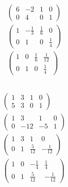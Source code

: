 \documentclass{article}
\begin{document}
\begin{align*}
  \left( \begin{array}{cc|cc}
           6 & -2 & 1 & 0 \\
           0 & 4  & 0 & 1
         \end{array} \right)                          \\
  \left( \begin{array}{cc|cc}
           1 & -\frac{1}{3} & \frac{1}{6} & 0           \\
           0 & 1            & 0           & \frac{1}{4}
         \end{array} \right) \\
  \left( \begin{array}{cc|cc}
           1 & 0 & \frac{1}{6} & \frac{1}{12} \\
           0 & 1 & 0           & \frac{1}{4}
         \end{array} \right)           \\
\end{align*}

\setcounter{subsubsection}{16}
\subsubsection{}

\begin{align*}
  \left( \begin{array}{cc|cc}
           1 & 3 & 1 & 0 \\
           5 & 3 & 0 & 1
         \end{array} \right)                  \\
  \left( \begin{array}{cc|cc}
           1 & 3   & 1  & 0 \\
           0 & -12 & -5 & 1
         \end{array} \right)                  \\
  \left( \begin{array}{cc|cc}
           1 & 3 & 1            & 0             \\
           0 & 1 & \frac{5}{12} & -\frac{1}{12}
         \end{array} \right) \\
  \left( \begin{array}{cc|cc}
           1 & 0 & -\frac{1}{4} & \frac{1}{4}   \\
           0 & 1 & \frac{5}{12} & -\frac{1}{12}
         \end{array} \right) \\
\end{align*}
\end{document}
